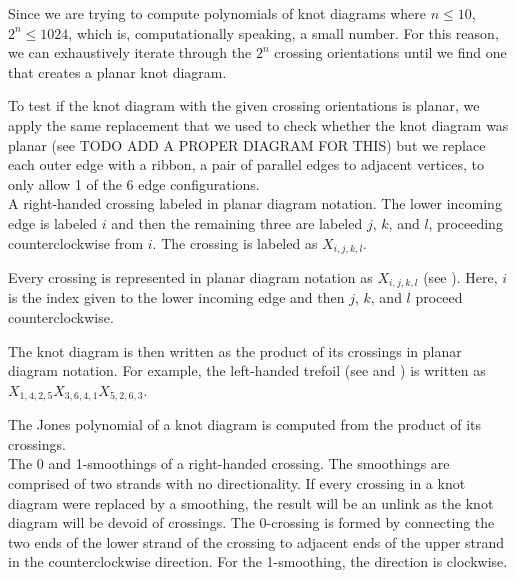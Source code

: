 \begin{paper}
Since we are trying to compute polynomials of knot diagrams where $n\leq10$,
$2^n\leq1024$, which is, computationally speaking, a small number.
For this reason, we can exhaustively iterate through the $2^n$ crossing
orientations until we find one that creates a planar knot diagram.

To test if the knot diagram with the given crossing orientations is planar, we
apply the same replacement that we used to check whether the knot diagram was
planar (see \figGraph TODO ADD A PROPER DIAGRAM FOR THIS) but we replace each
outer edge with a ribbon, a pair of parallel edges to adjacent vertices, to only
allow 1 of the 6 edge configurations.\\

{A right-handed crossing labeled in planar diagram notation.
The lower incoming edge is labeled $i$ and then the remaining three are labeled
$j$, $k$, and $l$, proceeding counterclockwise from $i$.
The crossing is labeled as $X_{i,j,k,l}$.}

Every crossing is represented in planar diagram notation as $X_{i,j,k,l}$ (see
\figX).
Here, $i$ is the index given to the lower incoming edge and then $j$, $k$, and
$l$ proceed counterclockwise.

The knot diagram is then written as the product of its crossings in planar
diagram notation.
For example, the left-handed trefoil (see \figTrefoil and \figLabeled) is
written as $X_{1,4,2,5}X_{3,6,4,1}X_{5,2,6,3}$.



The Jones polynomial of a knot diagram is computed from the product of its
crossings.\\

{The 0 and 1-smoothings of a right-handed crossing.
The smoothings are comprised of two strands with no directionality.
If every crossing in a knot diagram were replaced by a smoothing, the result
will be an unlink as the knot diagram will be devoid of crossings.
The 0-crossing is formed by connecting the two ends of the lower strand of the
crossing to adjacent ends of the upper strand in the counterclockwise direction.
For the 1-smoothing, the direction is clockwise.}


\end{paper}
